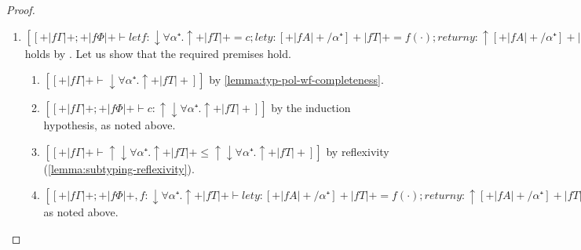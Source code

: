 \begin{proof}
\begin{caseof}
\begin{enumerate}
        \item $[[+|fΓ|+ ; +|fΦ|+  ⊢ let f : ↓∀α⁺.↑+|fT|+ = c; let y : [+|fA|+/α⁺]+|fT|+ = f(·); return y : ↑[+|fA|+/α⁺]+|fT|+]]$
          holds by . Let us show that the
          required premises hold.
          \begin{enumerate}
            \item $[[+|fΓ|+ ⊢ ↓∀α⁺.↑+|fT|+]]$ by \cref{lemma:typ-pol-wf-completeness}.
            \item $[[+|fΓ|+ ; +|fΦ|+ ⊢ c : ↑↓∀α⁺.↑+|fT|+]]$ by the induction hypothesis, as noted above.
            \item $[[+|fΓ|+  ⊢ ↑↓∀α⁺.↑+|fT|+ ≤ ↑↓∀α⁺.↑+|fT|+]]$ by reflexivity (\cref{lemma:subtyping-reflexivity}).
            \item $[[+|fΓ|+ ; +|fΦ|+, f : ↓∀α⁺.↑+|fT|+  ⊢ let y : [+|fA|+/α⁺]+|fT|+ = f(·); return y : ↑[+|fA|+/α⁺]+|fT|+]]$ as noted above.
          \end{enumerate}
      \end{enumerate}
  \end{caseof}
\end{proof}

